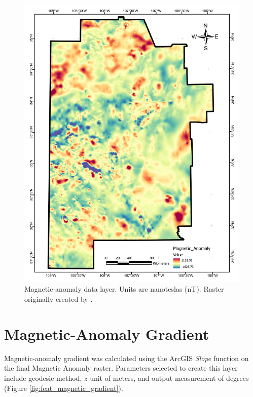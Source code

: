 \begin{figure}[H]
\centering
\includegraphics[width=0.75\linewidth]{templates/images/Figure-MagneticAnomaly.pdf}
\caption[Magnetic anomaly data layer]{Magnetic-anomaly data layer. Units are nanoteslas (nT). Raster originally created by \protect\citet{bielicki_hydrogeolgic_2015}.}
\label{fig:feat_magnetics}
\end{figure}

\section{Magnetic-Anomaly Gradient}\label{app:dl_magnetic_gradient}
Magnetic-anomaly gradient was calculated using the ArcGIS \textit{Slope} function on the final Magnetic Anomaly raster. Parameters selected to create this layer include geodesic method, $z$-unit of meters, and output measurement of degrees (Figure \ref{fig:feat_magnetic_gradient}).

